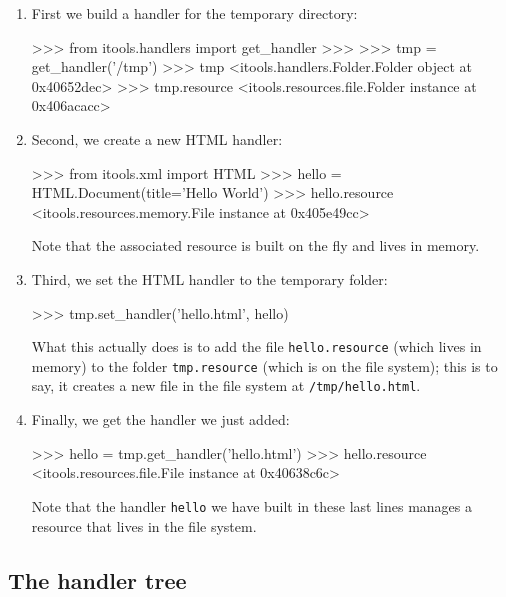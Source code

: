 \begin{enumerate}
  \item First we build a handler for the temporary directory:

\begin{code}
    >>> from itools.handlers import get_handler
    >>>
    >>> tmp = get_handler('/tmp')
    >>> tmp
    <itools.handlers.Folder.Folder object at 0x40652dec>
    >>> tmp.resource
    <itools.resources.file.Folder instance at 0x406acacc>
\end{code}

  \item Second, we create a new HTML handler:

\begin{code}
    >>> from itools.xml import HTML
    >>> hello = HTML.Document(title='Hello World')
    >>> hello.resource
    <itools.resources.memory.File instance at 0x405e49cc>
\end{code}

    Note that the associated resource is built on the fly and lives in memory.

  \item Third, we set the HTML handler to the temporary folder:

\begin{code}
    >>> tmp.set_handler('hello.html', hello)
\end{code}

    What this actually does is to add the file {\tt hello.resource} (which
    lives in memory) to the folder {\tt tmp.resource} (which is on the
    file system); this is to say, it creates a new file in the file system
    at {\tt /tmp/hello.html}.

  \item Finally, we get the handler we just added:

\begin{code}
    >>> hello = tmp.get_handler('hello.html')
    >>> hello.resource
    <itools.resources.file.File instance at 0x40638c6c>
\end{code}

    Note that the handler {\tt hello} we have built in these last lines
    manages a resource that lives in the file system.

\end{enumerate}



\subsection{The handler tree}

